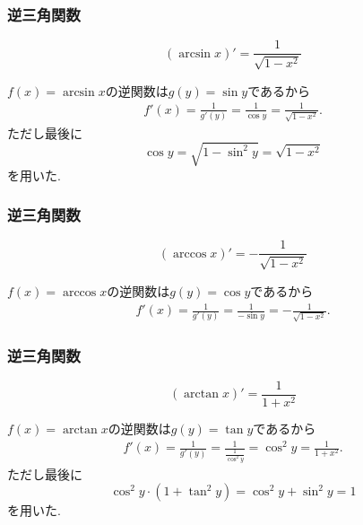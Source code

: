 \begin{frame}
\frametitle{逆三角関数}

\begin{Thm}
$$
(\arcsin x)'=\frac{1}{\sqrt{1-x^2}}
$$
\end{Thm}

$f(x)=\arcsin x$の逆関数は$g(y)=\sin y$であるから
\begin{align*}
f'(x)=\frac{1}{g'(y)}=\frac{1}{\cos y}=\frac{1}{\sqrt{1-x^2}}. 
\end{align*}
ただし最後に
$$
\cos y = \sqrt{1-\sin^2 y}=\sqrt{1-x^2}
$$
を用いた. 


\end{frame}





\begin{frame}
\frametitle{逆三角関数}

\begin{Thm}
$$
(\arccos x)'= - \frac{1}{\sqrt{1-x^2}}
$$
\end{Thm}

$f(x)=\arccos x$の逆関数は$g(y)=\cos y$であるから
\begin{align*}
f'(x)=\frac{1}{g'(y)}=\frac{1}{- \sin y}=-\frac{1}{\sqrt{1-x^2}}. 
\end{align*}
\end{frame}




\begin{frame}
\frametitle{逆三角関数}

\begin{Thm}
$$
(\arctan x)'= \frac{1}{1+x^2}
$$
\end{Thm}

$f(x)=\arctan x$の逆関数は$g(y)=\tan y$であるから
\begin{align*}
f'(x)=\frac{1}{g'(y)}=\frac{1}{\frac{1}{\cos^2 y}}=\cos^2 y = \frac{1}{1+x^2}.  
\end{align*}
ただし最後に
$$
\cos^2 y \cdot (1+\tan^2 y)=\cos^2 y + \sin^2 y = 1
$$
を用いた. 

\end{frame}




